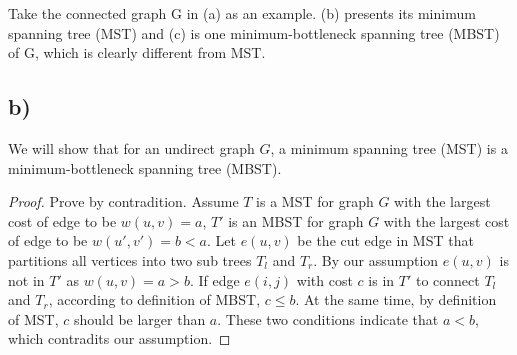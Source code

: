\documentclass[a4paper,10pt,twoside]{article}
\newtheorem{proof}{Proof}
\begin{document}
Take the connected graph G in (a) as an example. (b) presents its minimum spanning tree (MST) and (c) is one minimum-bottleneck spanning tree (MBST) of G, which is clearly different from MST. 

\subsection*{b)}
We will show that for an undirect graph $G$, a minimum spanning tree (MST) is a minimum-bottleneck spanning tree (MBST).
\begin{proof}
	Prove by contradition. 
	Assume $T$ is a MST for graph $G$ with the largest cost of edge to be $w(u, v) = a$,
	$T'$ is an MBST for graph $G$ with the largest cost of edge to be $w(u', v') = b < a$.
	Let $e(u, v)$ be the cut edge in MST that partitions all vertices into two sub trees 
	$T_{l}$ and $T_{r}$. By our assumption $e(u, v)$ is not in $T'$ as $w(u, v) = a > b$.
	If edge $e(i, j)$ with cost $c$ is in $T'$ to connect $T_{l}$ and $T_{r}$, according to definition 			of MBST, $c \leq b$. At the same time, by definition of MST, $c$ should be larger than $a$. 			These two conditions indicate that $a < b$, which contradits our assumption.

\end{proof}
\end{document}
